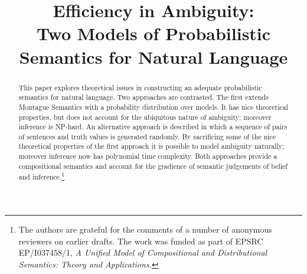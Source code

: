 \documentclass[manuscript]{clv2}
\title{Efficiency in Ambiguity:\\ Two Models of Probabilistic Semantics for Natural Language}
\author{
       }
\affil{}
\date{}
\begin{document}
\maketitle
\begin{abstract}
This paper explores theoretical issues in constructing an adequate probabilistic semantics for natural language. Two approaches are contrasted. The first extends Montague
Semantics with a probability distribution over 
models. It has nice theoretical properties, but does
not account for the ubiquitous nature of ambiguity; moreover inference is
NP-hard. An alternative approach is described in which a sequence of pairs of sentences and truth values is generated
randomly. By sacrificing some of the nice theoretical properties of
the first approach it is possible to model ambiguity naturally;
moreover inference now has polynomial time
complexity. Both approaches provide a compositional semantics and account for the gradience of semantic judgements of belief and inference.\footnote{The authors are grateful for the comments of a number of anonymous reviewers on earlier drafts. The work was funded as part of EPSRC EP/I037458/1, {\em A Unified Model of Compositional and Distributional Semantics: Theory and Applications\/.}}
\end{abstract}



\end{document}
